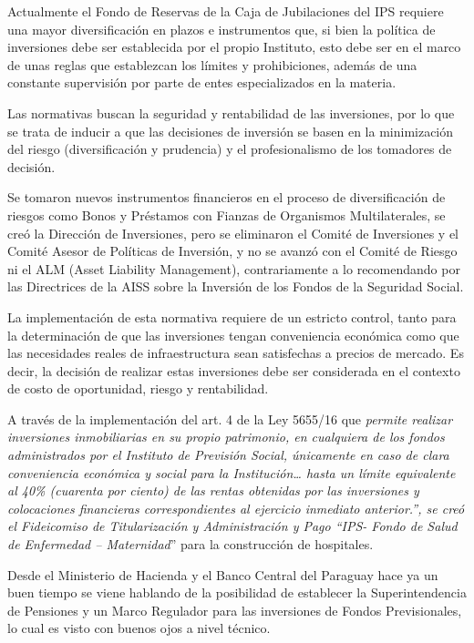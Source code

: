 \documentclass[a4paper,11pt]{article}
\begin{document}
Actualmente el Fondo de Reservas de la Caja de Jubilaciones del IPS requiere una mayor diversificación en plazos e instrumentos que, si bien la política de inversiones debe ser establecida por el propio Instituto, esto debe ser en el marco de unas reglas que establezcan los límites y prohibiciones, además de una constante supervisión por parte de entes especializados en la materia.

Las normativas buscan la seguridad y rentabilidad de las inversiones, por lo que se trata de inducir a que las decisiones de inversión se basen en la minimización del riesgo (diversificación y prudencia) y el profesionalismo de los tomadores de decisión.

Se tomaron nuevos instrumentos financieros en el proceso de diversificación de riesgos como Bonos y Préstamos con Fianzas de Organismos Multilaterales, se creó la Dirección de Inversiones, pero se eliminaron el Comité de Inversiones y el Comité Asesor de Políticas de Inversión, y no se avanzó con el Comité de Riesgo ni el ALM (Asset Liability Management), contrariamente a lo recomendando por las Directrices de la AISS sobre la Inversión de los Fondos de la Seguridad Social.


La implementación de esta normativa requiere de un estricto control, tanto para la determinación de que las inversiones tengan conveniencia económica como que las necesidades reales de infraestructura sean satisfechas a precios de mercado.  Es decir, la decisión de realizar estas inversiones debe ser considerada en el contexto de costo de oportunidad, riesgo y rentabilidad. 

A través de la implementación del art. 4 de la Ley 5655/16 que \textit{permite realizar inversiones inmobiliarias en su propio patrimonio, en cualquiera de los fondos administrados por el Instituto de Previsión Social, únicamente en caso de clara conveniencia económica y social para la Institución… hasta un límite equivalente al 40\% (cuarenta por ciento) de las rentas obtenidas por las inversiones y colocaciones financieras correspondientes al ejercicio inmediato anterior.”, se creó el Fideicomiso de Titularización y Administración y Pago “IPS- Fondo de Salud de Enfermedad – Maternidad}” para la construcción de hospitales. 

Desde el Ministerio de Hacienda y el Banco Central del Paraguay hace ya un buen tiempo se viene hablando de la posibilidad de establecer la Superintendencia de Pensiones y un Marco Regulador para las inversiones de Fondos Previsionales, lo cual es visto con buenos ojos a nivel técnico.
\end{document}
